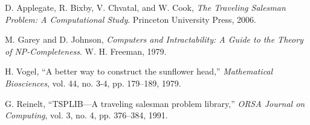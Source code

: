 \documentclass[conference]{IEEEtran}
\begin{document}
\begin{thebibliography}{99}

D. Applegate, R. Bixby, V. Chvatal, and W. Cook,
\textit{The Traveling Salesman Problem: A Computational Study}.
Princeton University Press, 2006.

M. Garey and D. Johnson,
\textit{Computers and Intractability: A Guide to the Theory of NP-Completeness}.
W. H. Freeman, 1979.

H. Vogel,
``A better way to construct the sunflower head,''
\textit{Mathematical Biosciences}, vol. 44, no. 3-4, pp. 179--189, 1979.

G. Reinelt,
``TSPLIB—A traveling salesman problem library,''
\textit{ORSA Journal on Computing}, vol. 3, no. 4, pp. 376--384, 1991.


\end{thebibliography}
\end{document}
